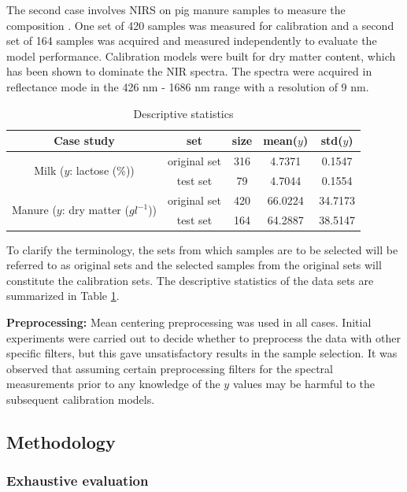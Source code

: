 \documentclass[preprint,12pt]{elsarticle}
\begin{document}
The second case involves NIRS on pig manure samples to measure the composition \cite{Saeys2005}. One set of 420 samples was measured for calibration and a second set of 164 samples was acquired and measured independently to evaluate the model performance. Calibration models were built for dry matter content, which has been shown to dominate the NIR spectra. The spectra were acquired in reflectance mode in the 426 nm - 1686 nm range with a resolution of 9 nm.


\begin{table}[t]
\centering
\begin{tabular}{|c|c|c|c|c|} 
\hline
Case study	& set & size & mean($y$) & std($y$)  	\\
\hline
\multirow{2}{10em}{Milk ($y$: lactose (\%))} & original set & 316 & 4.7371 & 0.1547\\
& test set & 79 & 4.7044 & 0.1554\\
\hline
\multirow{2}{10em}{Manure ($y$: dry matter ($gl^{-1}$))} & original set & 420 & 66.0224 & 34.7173\\
& test set & 164 & 64.2887 & 38.5147 \\
\hline 


\end{tabular}
\caption{Descriptive statistics}
\label{tab_descriptive_statistics}
\end{table}

To clarify the terminology, the sets from which samples are to be selected will be referred to as original sets and the selected samples from the original sets will constitute the calibration sets. The descriptive statistics of the data sets are summarized in Table \ref{tab_descriptive_statistics}.

\textbf{Preprocessing:} Mean centering preprocessing was used in all cases. Initial experiments were carried out to decide whether to preprocess the data with other specific filters, but this gave unsatisfactory results in the sample selection. It was observed that assuming certain preprocessing filters for the spectral measurements prior to any knowledge of the $y$ values may be harmful to the subsequent calibration models. 

\subsection{Methodology}\label{methodology}

\subsubsection{Exhaustive evaluation}
\end{document}
